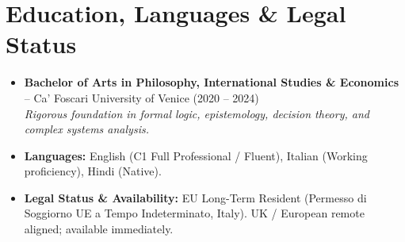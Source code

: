 \documentclass[a4paper,10pt]{article}
\begin{document}
\section{Education, Languages \& Legal Status}
\begin{itemize}
  \item \textbf{Bachelor of Arts in Philosophy, International Studies \& Economics} -- Ca' Foscari University of Venice (2020 -- 2024) \\
  \textit{Rigorous foundation in formal logic, epistemology, decision theory, and complex systems analysis.}
  \item \textbf{Languages:} English (C1 Full Professional / Fluent), Italian (Working proficiency), Hindi (Native).
  \item \textbf{Legal Status \& Availability:} EU Long-Term Resident (Permesso di Soggiorno UE a Tempo Indeterminato, Italy). UK / European remote aligned; available immediately.
\end{itemize}
\end{document}
